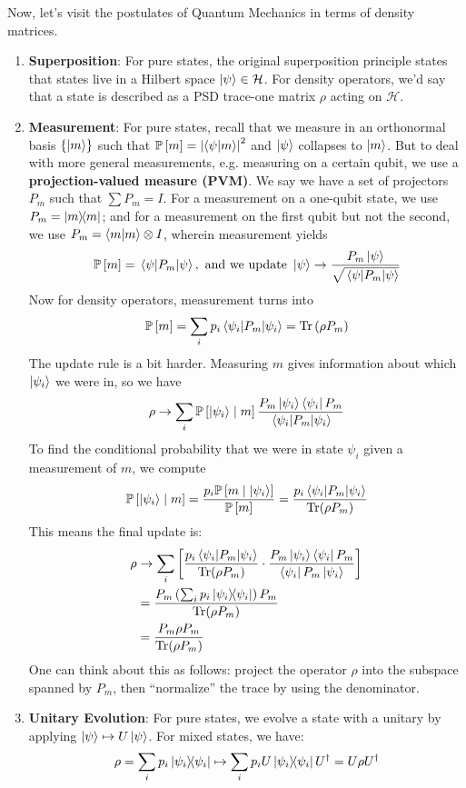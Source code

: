 Now, let's visit the postulates of Quantum Mechanics in terms of density matrices.
\begin{theorem}
    \begin{enumerate}
    \item \textbf{Superposition}: For pure states, the original superposition principle states that states live in a Hilbert space $\ket{\psi} \in \mathcal{H}$. For density operators,
    we'd say that a state is described as a PSD trace-one matrix $\rho$ acting on $\mathcal{H}$.
    \item \textbf{Measurement}: For pure states, recall that we measure in an orthonormal basis $\{\ket{m}\}$ such that
    $\mathbb{P}\left[ m \right] = \qty|\braket{\psi}{m}|^2$ and $\ket{\psi}$ collapses to $\ket{m}$. But to deal with more general measurements,
    e.g. measuring on a certain qubit, we use a \textbf{projection-valued measure (PVM)}. We say we have a set of projectors
    $P_m$ such that $\sum P_m = I$. For a measurement on a one-qubit state, we use $P_m = \ketbra{m}{m}$; and for a measurement on the first qubit but not the second,
    we use $P_m = \braket{m}{m} \otimes I$, wherein measurement yields
    \[ \mathbb{P}\left[ m \right] = \mel{\psi}{P_m}{\psi}, \text{ and we update } \ket{\psi} \to \frac{P_m \ket{\psi}}{\sqrt{\mel{\psi}{P_m}{\psi}}} \]
    Now for density operators, measurement turns into
    \[ \mathbb{P}\left[ m \right] = \sum_i p_i \mel{\psi_i}{P_m}{\psi_i} = \Tr\qty(\rho P_m) \]
    The update rule is a bit harder. Measuring $m$ gives information about which $\ket{\psi_i}$ we were in, so we have 
    \[ \rho \to \sum_i \mathbb{P}\left[ \ket{\psi_i} \mid m \right] \frac{P_m \ket{\psi_i} \bra{\psi_i} P_m}{\mel{\psi_i}{P_m}{\psi_i}} \]
    To find the conditional probability that we were in state $\psi_i$ given a measurement of $m$, we compute 
    \[ \mathbb{P}\left[ \ket{\psi_i} \mid m \right] = \frac{p_i \mathbb{P}\left[ m \mid \ket{\psi_i} \right]}{\mathbb{P}\left[ m \right]} = \frac{p_i\mel{\psi_i}{P_m}{\psi_i}}{\Tr(\rho P_m)} \]
    This means the final update is:
    \begin{align*}
        \rho &\to \sum_i \left[\frac{p_i\mel{\psi_i}{P_m}{\psi_i}}{\Tr(\rho P_m)} \cdot \frac{P_m \ket{\psi_i} \bra{\psi_i} P_m}{\bra{\psi_i} P_m \ket{\psi_i}}\right] \\
        &= \frac{P_m \left(\sum_i p_i \ketbra{\psi_i}{\psi_i}\right) P_m}{\Tr(\rho P_m)}\\
        &= \frac{P_m \rho P_m}{\Tr(\rho P_m)}
    \end{align*}
    One can think about this as follows: project the operator $\rho$ into the subspace spanned by $P_m$,
    then ``normalize'' the trace by using the denominator.
    \item \textbf{Unitary Evolution}: For pure states, we evolve a state with a unitary by applying $\ket{\psi} \mapsto U\ket{\psi}$. For mixed states, we have:
    \[ \rho = \sum_i p_i \ketbra{\psi_i}{\psi_i} \mapsto \sum_i p_i U \ketbra{\psi_i}{\psi_i} U^{\dagger} = U \rho U^{\dagger} \]
    \end{enumerate}
\end{theorem}


